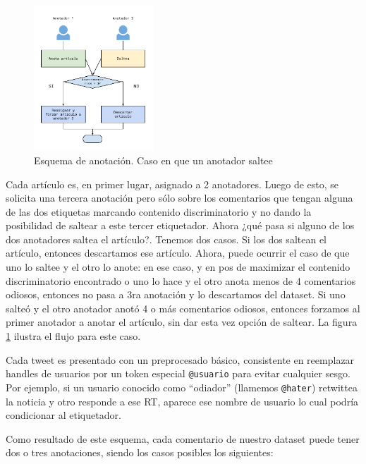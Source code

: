 \begin{figure}
    \centering
    \includegraphics[width=0.4\textwidth]{img/esquema_anotacion_caso_2.pdf}
    \caption{Esquema de anotación. Caso en que un anotador saltee}
    \label{fig:annotation_schema_case_two}
\end{figure}

Cada artículo es, en primer lugar, asignado a 2 anotadores. Luego de esto, se solicita una tercera anotación pero sólo sobre los comentarios que tengan alguna de las dos etiquetas marcando contenido discriminatorio y no dando la posibilidad de saltear a este tercer etiquetador. Ahora ¿qué pasa si alguno de los dos anotadores saltea el artículo?. Tenemos dos casos. Si los dos saltean el artículo, entonces descartamos ese artículo. Ahora, puede ocurrir el caso de que uno lo saltee y el otro lo anote: en ese caso, y en pos de maximizar el contenido discriminatorio encontrado o uno lo hace y el otro anota menos de 4 comentarios odiosos, entonces no pasa a 3ra anotación y lo descartamos del dataset. Si uno salteó y el otro anotador anotó 4 o más comentarios odiosos, entonces forzamos al primer anotador a anotar el artículo, sin dar esta vez opción de saltear. La figura \ref{fig:annotation_schema_case_two} ilustra el flujo para este caso.


Cada tweet es presentado con un preprocesado básico, consistente en reemplazar handles de usuarios por un token especial \verb|@usuario| para evitar cualquier sesgo. Por ejemplo, si un usuario conocido como ``odiador'' (llamemos \verb|@hater|) retwittea la noticia y otro responde a ese RT, aparece ese nombre de usuario lo cual podría condicionar al etiquetador.




Como resultado de este esquema, cada comentario de nuestro dataset puede tener dos o tres anotaciones, siendo los casos posibles los siguientes:

